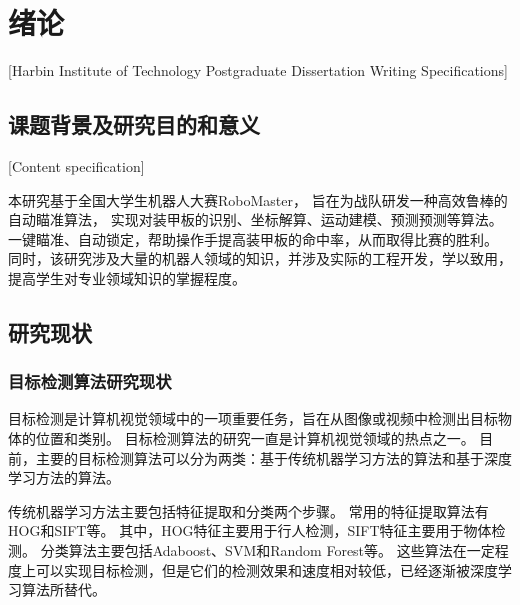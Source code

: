 
\chapter[绪论]{绪论}[Harbin Institute of Technology Postgraduate Dissertation Writing Specifications]

\section{课题背景及研究目的和意义}[Content specification]

本研究基于全国大学生机器人大赛RoboMaster，
旨在为战队研发一种高效鲁棒的自动瞄准算法，
实现对装甲板的识别、坐标解算、运动建模、预测预测等算法。
一键瞄准、自动锁定，帮助操作手提高装甲板的命中率，从而取得比赛的胜利。
同时，该研究涉及大量的机器人领域的知识，并涉及实际的工程开发，学以致用，提高学生对专业领域知识的掌握程度。

\section{研究现状}

\subsection{目标检测算法研究现状}
目标检测是计算机视觉领域中的一项重要任务，旨在从图像或视频中检测出目标物体的位置和类别。
目标检测算法的研究一直是计算机视觉领域的热点之一。
目前，主要的目标检测算法可以分为两类：基于传统机器学习方法的算法和基于深度学习方法的算法。\par


传统机器学习方法主要包括特征提取和分类两个步骤。
常用的特征提取算法有HOG\cite{pang2011efficient}和SIFT\cite{ng2003sift}等。
其中，HOG特征主要用于行人检测，SIFT特征主要用于物体检测。
分类算法主要包括Adaboost\cite{hastie2009multi}、SVM\cite{schuldt2004recognizing}和Random Forest\cite{biau2016random}等。
这些算法在一定程度上可以实现目标检测，但是它们的检测效果和速度相对较低，已经逐渐被深度学习算法所替代。

\par

